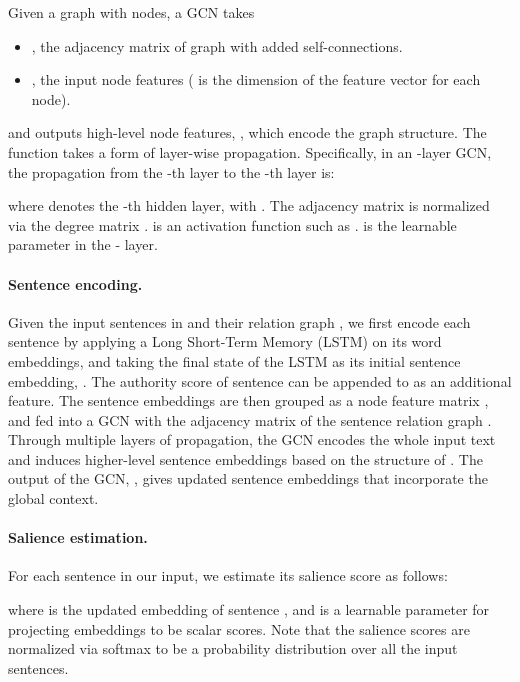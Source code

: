 \documentclass[letterpaper]{article} \usepackage{aaai19}  \usepackage{times}  \usepackage{helvet}  \usepackage{courier}  \usepackage{url}
\begin{document}
Given a graph  with  nodes,
a GCN takes
\begin{itemize}[topsep=5pt]
    \setlength{\parskip}{-1mm}
    \item ,\vspace{-0.3mm} the adjacency matrix of graph  with added self-connections.
    \item ,\vspace{-0.3mm} the input node features ( is the dimension of the feature vector for each node).
\end{itemize}\vspace{-1mm}
and outputs high-level node features, , which encode the graph structure.
The function takes a form of layer-wise propagation.
Specifically,
in an -layer GCN, the propagation from the -th layer to the -th layer is:

where  denotes the -th hidden layer, with .
The adjacency matrix  is normalized via the degree matrix .
 is an activation function such as .
 is the learnable parameter in the -{} layer.



\paragraph{Sentence encoding.}
Given the input sentences   in  and their relation graph , we first encode each sentence  by applying a
Long Short-Term Memory (LSTM) \cite{Hochreiter:1997:LSM:1246443.1246450}
on its word embeddings, and taking the final
state of the LSTM as its initial sentence embedding, .
The authority score of
sentence  can be appended to  as an additional feature.
The
sentence embeddings  \scalebox{0.9}{} are then grouped as
a node feature matrix ,
and
fed into a GCN
with the adjacency matrix  of the sentence relation graph .
Through multiple layers of propagation, the GCN
encodes the whole input text and induces higher-level sentence embeddings based on the structure of .
The output of the GCN, , gives updated sentence embeddings  that incorporate the global context.



\paragraph{Salience estimation.}

For each sentence  in our input, we estimate its salience score as follows:

where  is the updated embedding of sentence , and  is a learnable parameter for projecting embeddings to be scalar scores.
Note that the salience scores are normalized via softmax to be a probability distribution over all the input sentences.
\end{document}

